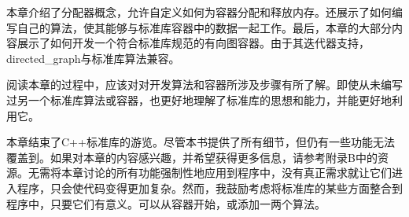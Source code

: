 本章介绍了分配器概念，允许自定义如何为容器分配和释放内存。还展示了如何编写自己的算法，使其能够与标准库容器中的数据一起工作。最后，本章的大部分内容展示了如何开发一个符合标准库规范的有向图容器。由于其迭代器支持，directed\_graph与标准库算法兼容。

阅读本章的过程中，应该对对开发算法和容器所涉及步骤有所了解。即使从未编写过另一个标准库算法或容器，也更好地理解了标准库的思想和能力，并能更好地利用它。

本章结束了C++标准库的游览。尽管本书提供了所有细节，但仍有一些功能无法覆盖到。如果对本章的内容感兴趣，并希望获得更多信息，请参考附录B中的资源。无需将本章讨论的所有功能强制性地应用到程序中，没有真正需求就让它们进入程序，只会使代码变得更加复杂。然而，我鼓励考虑将标准库的某些方面整合到程序中，只要它们有意义。可以从容器开始，或添加一两个算法。
